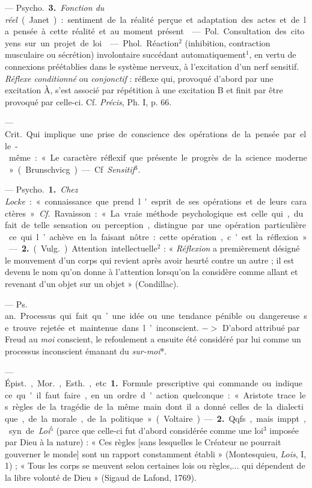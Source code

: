 \begin{itemize}[leftmargin=1cm, label=, itemsep=1pt]
— \si{Psycho.} {\bf 3.} {\it Fonction du réel} (Janet) : sentiment de la
réalité perçue et adaptation des actes et de la pensée à cette réalité et au
moment présent.

 — \si{Pol.} Consultation des citoyens sur un projet de loi.

 — \si{Phol.} Réaction$^2$ (inhibition, contraction musculaire ou
sécrétion) involontaire succédant automatiquement$^1$, en vertu de connexions
préétablies dans le système nerveux, à l'excitation d’un nerf sensitif. {\it
Réflexe conditionné} ou {\it conjonctif} : réflexe qui, provoqué d’abord par
une excitation À, s’est associé par répétition à une excitation B et finit
par être provoqué par celle-ci. Cf. {\it Précis}, Ph. I, p. 66.

 — \si{Crit.} Qui implique une prise de conscience des
opérations de la pensée par elle-même : « Le caractère réflexif que présente
le progrès de la science moderne » (Brunschvicg). — Cf. {\it Sensitif}$^3$.

 — \si{Psycho.} {\bf 1.} {\it Chez Locke} : « connaissance que
prend l'esprit de ses opérations et de leurs caractères ». {\it Cf.}
Ravaisson : « La vraie méthode psychologique est celle qui, du fait de telle
sensation ou perception, distingue par une opération particulière ce qui
l’achève en la faisant nôtre : cette opération, c'est la réflexion. » —
{\bf 2.} (\si{Vulg.}) Attention intellectuelle$^2$ : « {\it Réflexion} a
premièrement désigné le mouvement d’un corps qui revient après avoir heurté
contre un autre ; il est devenu le nom qu'on donne à l'attention lorsqu'on la
considère comme allant et revenant d’un objet sur un objet » (Condillac).

 — \si{Ps. an.} Processus qui fait qu’une idée ou une
tendance pénible ou dangereuse se trouve rejetée et maintenue dans
l’inconscient. $->$ D'abord attribué par Freud au {\it moi} conscient, le
refoulement a ensuite été considéré par lui
comme un processus inconscient émanant du {\it sur-moi}*.

 — \si{Épist.}, \si{Mor.}, \si{Esth.}, etc. {\bf 1.} Formule
prescriptive qui commande ou indique ce qu'il faut faire, en un ordre
d'action quelconque : « Aristote trace les règles de la tragédie de la même
main dont il a donné celles de la dialectique, de la morale, de la politique
» (Voltaire). — {\bf 2.} Qqfs., mais imppt., syn. de {\it Loi}$^5$ (parce que
celle-ci fut d’abord considérée comme une loi$^3$ imposée par Dieu à la
nature) : « Ces règles [sans lesquelles le Créateur ne pourrait gouverner le
monde] sont un rapport constamment établi » (Montesquieu, {\it Lois}, I, 1) ;
« Tous les corps se meuvent selon certaines lois ou règles,... qui dépendent
de la libre volonté de Dieu » (Sigaud de Lafond, 1769).


\end{itemize}
